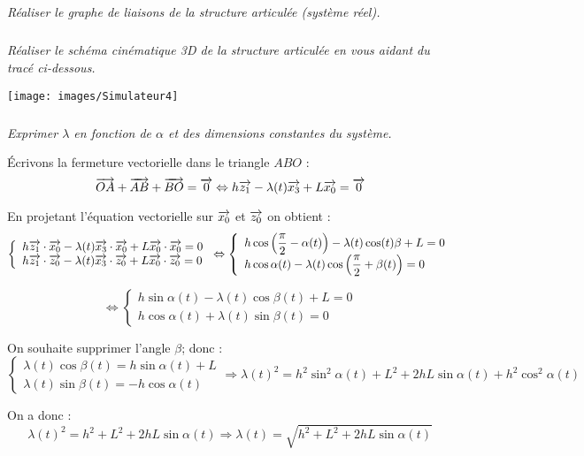 \documentclass[10pt]{article}
\newif\ifprof
\begin{document}
\fi
\subparagraph{}
\textit{Réaliser le graphe de liaisons de la structure articulée (système réel). }
\ifprof
\begin{corrige}
\begin{center}
\texttt{[image: images/Corr\_01]}
\end{center}
\end{corrige}
\else
\fi

\subparagraph{}
\textit{Réaliser le schéma cinématique 3D de la structure articulée en vous aidant du tracé ci-dessous.}
\ifprof
\begin{corrige}
\begin{center}
\texttt{[image: images/Corr\_02]}
\end{center}

\end{corrige}
\else
\begin{center}
\texttt{[image: images/Simulateur4]}
\end{center}
\fi

\subparagraph{}
\textit{Exprimer $\lambda$ en fonction de $\alpha$ et des dimensions constantes du système.} 
\ifprof
\begin{corrige}
Écrivons la fermeture vectorielle dans le triangle $ABO$ :
$$
\overrightarrow{OA} + \overrightarrow{AB} + \overrightarrow{BO} = \overrightarrow{0}  \Leftrightarrow  
h\overrightarrow{z_1} - \lambda(t) \overrightarrow{x_3} + L\overrightarrow{x_0} = \overrightarrow{0}
$$

En projetant l'équation vectorielle sur $\overrightarrow{x_0}$ et $\overrightarrow{z_0}$ on obtient : 
$$
\left\{
\begin{array}{l}
h\overrightarrow{z_1}\cdot\overrightarrow{x_0} - \lambda(t) \overrightarrow{x_3}\cdot\overrightarrow{x_0} + L\overrightarrow{x_0}\cdot\overrightarrow{x_0} = 0 \\
h\overrightarrow{z_1}\cdot\overrightarrow{z_0} - \lambda(t) \overrightarrow{x_3}\cdot\overrightarrow{z_0} + L\overrightarrow{x_0}\cdot\overrightarrow{z_0} = 0
\end{array}
\right.
\Leftrightarrow
\left\{
\begin{array}{l}
h\cos\left(\dfrac{\pi}{2} - \alpha(t)\right) - \lambda(t) \cos(t)\beta + L = 0 \\
h\cos\alpha(t) - \lambda(t) \cos\left(\dfrac{\pi}{2} + \beta(t)\right)  = 0
\end{array}
\right.
$$

$$
\Leftrightarrow
\left\{
\begin{array}{l}
h\sin \alpha(t) - \lambda(t) \cos\beta(t) + L = 0 \\
h\cos\alpha(t) + \lambda(t) \sin\beta(t)  = 0
\end{array}
\right.
$$

On souhaite supprimer l'angle $\beta$; donc :
$$
\left\{
\begin{array}{l}
\lambda(t) \cos\beta(t) = h\sin \alpha(t)  + L \\
\lambda(t) \sin\beta(t)  = - h\cos\alpha(t) 
\end{array}
\right.
\Longrightarrow
\lambda(t)^2 = h^2 \sin^2 \alpha(t) + L^2 + 2 h L \sin\alpha(t) + h^2 \cos^2\alpha(t)
$$

On a donc : 
$$
\lambda(t)^2 = h^2 + L^2 + 2 h L \sin\alpha(t)  \Longrightarrow
\lambda(t) = \sqrt{h^2 + L^2 + 2 h L \sin\alpha(t)}
$$
\end{corrige}
\end{document}
